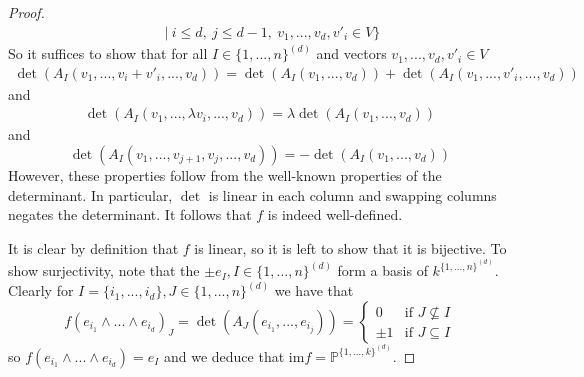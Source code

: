 \documentclass{scrartcl}
\newcommand{\Proj}{\mathbb{P}}
\begin{document}
\begin{proof}
\begin{align*}
        &\quad | \ i \leq d, \ j \leq d - 1, \ v_1, ..., v_d, v'_i \in V\Bigr\}
    \end{align*}
    So it suffices to show that for all $I \in \{1, ..., n\}^{(d)}$ and vectors $v_1, ..., v_d, v'_i \in V$
    \begin{align*}
        \det(A_I(v_1, ..., v_i + v'_i, ..., v_d)) = \det(A_I(v_1, ..., v_d)) + \det(A_I(v_1, ..., v'_i, ..., v_d))
    \end{align*}
    and
    \begin{align*}
        \det(A_I(v_1, ..., \lambda v_i, ..., v_d)) = \lambda\det(A_I(v_1, ..., v_d))
    \end{align*}
    and
    \begin{equation*}
        \det(A_I(v_1, ..., v_{j + 1}, v_j, ..., v_d)) = -\det(A_I(v_1, ..., v_d))
    \end{equation*}
    However, these properties follow from the well-known properties of the determinant.
    In particular, $\det$ is linear in each column and swapping columns negates the determinant.
    It follows that $f$ is indeed well-defined.

    It is clear by definition that $f$ is linear, so it is left to show that it is bijective. 
    To show surjectivity, note that the $\pm e_I, I \in \{1, ..., n\}^{(d)}$ form a basis of $k^{\{1, ..., n\}^{(d)}}$.
    Clearly for $I = \{i_1, ..., i_d\}, J \in \{1, ..., n\}^{(d)}$ we have that
    \begin{equation*}
        f(e_{i_1} \wedge ... \wedge e_{i_d})_J = \det(A_J(e_{i_1}, ..., e_{i_j})) = \begin{cases}
            0 & \text{if $J \not\subseteq I$} \\
            \pm 1 & \text{if $J \subseteq I$}
        \end{cases}
    \end{equation*}
    so $f(e_{i_1} \wedge ... \wedge e_{i_d}) = e_I$ and we deduce that $\mathrm{im}f = \Proj^{\{1, ..., k\}^{(d)}}$.


\end{proof}
\end{document}
